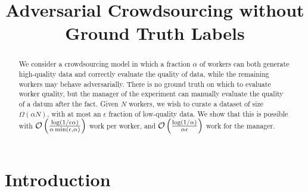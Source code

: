 \documentclass[anon,12pt]{colt2016} %
\title[Adversarial Crowdsourcing without Ground Truth Labels]{Adversarial Crowdsourcing without Ground Truth Labels}
\newcommand{\goodfrac}{\alpha}
\newcommand{\quality}{\epsilon}
\begin{document}
\maketitle

\begin{abstract}
We consider a crowdsourcing model in which a fraction $\goodfrac$ of 
workers can both generate high-quality data and correctly evaluate 
the quality of data, while the remaining workers may behave adversarially. 
There is no ground truth on which to evaluate worker quality, but the 
manager of the experiment can manually evaluate the quality of 
a datum after the fact. Given $N$ workers, we wish to curate a dataset 
of size $\Omega(\goodfrac N)$, with at most an $\quality$ fraction of low-quality 
data. We show that this is possible with 
$\oo\p{\frac{\log(1/\quality\goodfrac)}{\goodfrac\min\p{\quality,\goodfrac}}}$ 
work per worker, and $\oo\p{\frac{\log(1/\goodfrac)}{\goodfrac\quality}}$ 
work for the manager.
\end{abstract}

\begin{keywords}
\end{keywords}

\section{Introduction}
\end{document}

